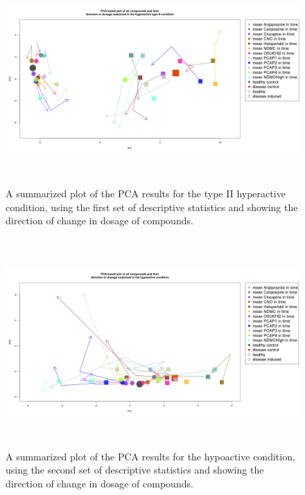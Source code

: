 \documentclass[a4paper,12pt]{article}
\begin{document}
\begin{figure}[h!]
\begin{center}
\includegraphics[width=16cm,height=8cm]{All_together_doses_DarkPTZ.png}
\caption{A summarized plot of the PCA results for the type II hyperactive condition, using the first set of descriptive statistics and showing the direction of change in dosage of compounds.}
\end{center}
\end{figure}
\newpage


\begin{figure}[h!]
\begin{center}
\includegraphics[width=16cm,height=8cm]{All_together_doses_DarkApoLowset2.png}
\caption{A summarized plot of the PCA results for the hypoactive condition, using the second set of descriptive statistics and showing the direction of change in dosage of compounds.}
\end{center}
\end{figure}
\newpage
\end{document}
